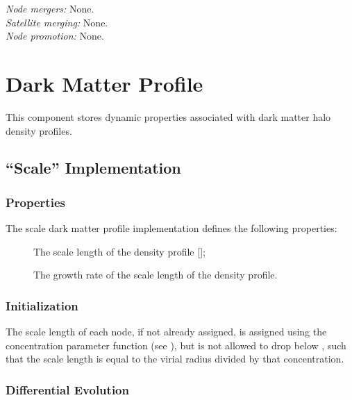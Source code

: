 \noindent\emph{Node mergers:} None.\\

\noindent\emph{Satellite merging:} None.\\

\noindent\emph{Node promotion:} None.

\section{Dark Matter Profile}\label{sec:DarkMatterProfileComponent}

This \gls{component} stores dynamic properties associated with dark matter halo density profiles.

\subsection{``Scale'' Implementation}\label{sec:DarkMatterProfileScale}

\subsubsection{Properties}

The scale dark matter profile implementation defines the following properties:
\begin{description}
 \item [] The scale length of the density profile [];
 \item [] The growth rate of the scale length of the density profile.
\end{description}

\subsubsection{Initialization}

The scale length of each node, if not already assigned, is assigned using the concentration parameter function (see ), but is not allowed to drop below \mono{[darkMatterProfileMinimumConcentration]}, such that the scale length is equal to the virial radius divided by that concentration.

\subsubsection{Differential Evolution}

